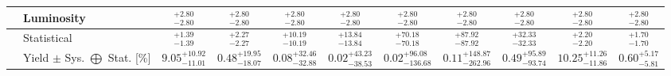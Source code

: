 \begin{tabular}{|cl||ccccccc|c||c|}
\hline
&Luminosity &  $^{+2.80}_{-2.80}$  &  $^{+2.80}_{-2.80}$  &  $^{+2.80}_{-2.80}$  &  $^{+2.80}_{-2.80}$  &  $^{+2.80}_{-2.80}$  &  $^{+2.80}_{-2.80}$  &  $^{+2.80}_{-2.80}$  &  $^{+2.80}_{-2.80}$  &  $^{+2.80}_{-2.80}$ \\ 
\hline
&Statistical &  $^{+1.39}_{-1.39}$  &  $^{+2.27}_{-2.27}$  &  $^{+10.19}_{-10.19}$  &  $^{+13.84}_{-13.84}$  &  $^{+70.18}_{-70.18}$  &  $^{+87.92}_{-87.92}$  &  $^{+32.33}_{-32.33}$  &  $^{+2.20}_{-2.20}$  &  $^{+1.70}_{-1.70}$ \\ 
\hline
\hline
&Yield $\pm$ Sys. $\bigoplus$ Stat. [\%] &  $9.05^{+10.92}_{-11.01}$  &  $0.48^{+19.95}_{-18.07}$  &  $0.08^{+32.46}_{-32.88}$  &  $0.02^{+43.23}_{-38.53}$  &  $0.02^{+96.08}_{-136.68}$  &  $0.11^{+148.87}_{-262.96}$  &  $0.49^{+95.89}_{-93.74}$  &  $10.25^{+11.26}_{-11.86}$  &  $0.60^{+5.17}_{-5.81}$ \\ 
\hline
\end{tabular}
